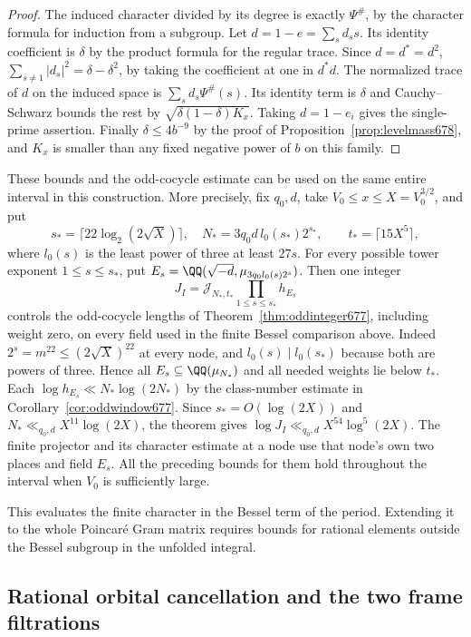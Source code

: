\documentclass[a4paper,11pt]{article}
\theoremstyle{definition}
\theoremstyle{remark}
\numberwithin{equation}{section}
\begin{document}
\begin{proof}
The induced character divided by its degree is exactly
\(\Psi^\#\), by the character formula for induction from a
subgroup. Let \(d=1-e=\sum_s d_s s\). Its identity
coefficient is \(\delta\) by the product formula for the
regular trace. Since \(d=d^*=d^2\),
\(\sum_{s\ne1}|d_s|^2=\delta-\delta^2\), by taking the
coefficient at one in \(d^*d\). The normalized trace of \(d\)
on the induced space is \(\sum_s d_s\Psi^\#(s)\). Its identity
term is \(\delta\) and Cauchy--Schwarz bounds the rest by
\(\sqrt{\delta(1-\delta)K_x}\). Taking \(d=1-e_i\) gives the
single-prime assertion. Finally \(\delta\le4b^{-9}\) by the
proof of Proposition~\ref{prop:levelmass678}, and \(K_x\)
is smaller than any fixed negative power of \(b\) on this
family.
\end{proof}

These bounds and the odd-cocycle estimate can be used on the
same entire interval in this construction. More precisely,
fix \(q_0,d\), take \(V_0\le x\le X=V_0^{3/2}\), and put
\[
 s_*=\lceil 22\log_2(2\sqrt X)\rceil,\quad
 N_*=3q_0d\,l_0(s_*)2^{s_*},\qquad t_*=\lceil 15X^5\rceil ,
\]
where \(l_0(s)\) is the least power of three at least \(27s\).
For every possible tower exponent \(1\le s\le s_*\), put
\(E_s=\QQ(\sqrt{-d},\mu_{3q_0l_0(s)2^s})\). Then one integer
\[
             J_I=\mathcal J_{N_*,t_*}\prod_{1\le s\le s_*}h_{E_s}
\]
controls the odd-cocycle lengths of Theorem~\ref{thm:oddinteger677},
including weight zero, on every field used in the finite
Bessel comparison above. Indeed \(2^s=m^{22}\le(2\sqrt X)^{22}\)
at every node, and \(l_0(s)\mid l_0(s_*)\) because both are
powers of three. Hence all \(E_s\subseteq\QQ(\mu_{N_*})\) and
all needed weights lie below \(t_*\). Each
\(\log h_{E_s}\ll N_*\log(2N_*)\) by the class-number estimate
in Corollary~\ref{cor:oddwindow677}. Since \(s_*=O(\log(2X))\)
and \(N_*\ll_{q_0,d}X^{11}\log(2X)\), the theorem gives
\(\log J_I\ll_{q_0,d}X^{54}\log^5(2X)\). The finite projector
and its character estimate at a node use that node's own two
places and field \(E_s\). All the preceding bounds for them
hold throughout the interval when \(V_0\) is sufficiently large.

This evaluates the finite character in the Bessel term of the
period. Extending it to the whole Poincar\'e Gram matrix
requires bounds for rational elements outside the Bessel
subgroup in the unfolded integral.


\subsection{Rational orbital cancellation and the two frame filtrations}
\label{sec:rationalflags680}
\end{document}
